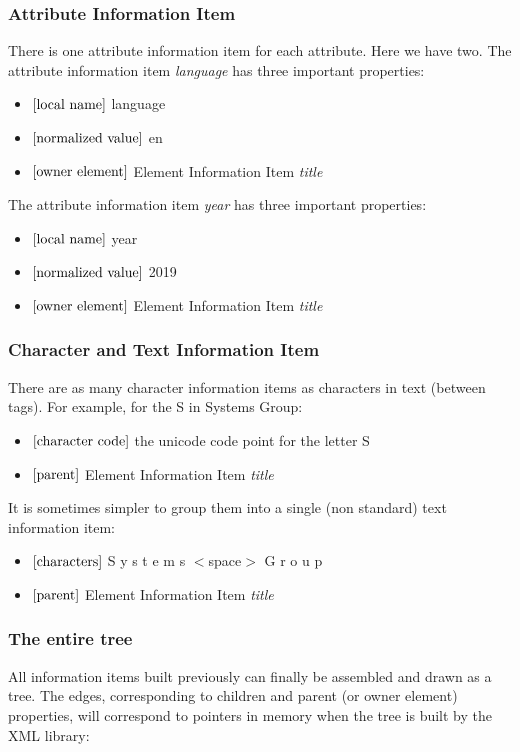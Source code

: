 \subsubsection{Attribute Information Item}
There is one attribute information item for each attribute. Here we have two.
The attribute information item \textit{language} has three important properties:
\begin{itemize}
    \item $\left[ \text{local name} \right]$ language
    \item $\left[ \text{normalized value} \right]$ en
    \item $\left[ \text{owner element} \right]$ Element Information Item \textit{title}
\end{itemize}
The attribute information item \textit{year} has three important properties:
\begin{itemize}
    \item $\left[ \text{local name} \right]$ year
    \item $\left[ \text{normalized value} \right]$ 2019
    \item $\left[ \text{owner element} \right]$ Element Information Item \textit{title}
\end{itemize}

\subsubsection{Character and Text Information Item}
There are as many character information items as characters in text (between tags). For example, for the S in Systems Group:
\begin{itemize}
    \item $\left[ \text{character code} \right]$ the unicode code point for the letter S
    \item $\left[ \text{parent} \right]$ Element Information Item \textit{title}
\end{itemize}
It is sometimes simpler to group them into a single (non standard) text information item:
\begin{itemize}
    \item $\left[ \text{characters} \right]$ S y s t e m s $<$space$>$ G r o u p
    \item $\left[ \text{parent} \right]$ Element Information Item \textit{title}
\end{itemize}

\subsubsection{The entire tree}
All information items built previously can finally be assembled and drawn as a tree. The edges, corresponding to children and parent (or owner element) properties, will correspond to pointers in memory when the tree is built by the XML library:

